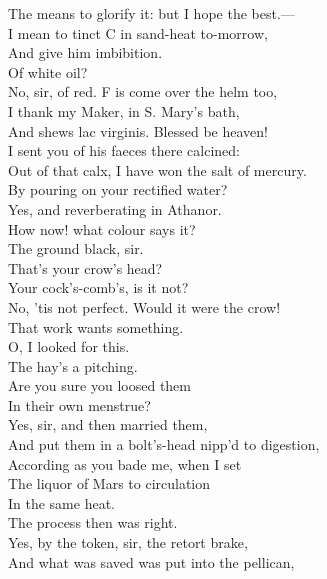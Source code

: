\documentclass[a4paper,oneside]{memoir}
\begin{document}
\begin{drama*}
The means to glorify it: but I hope the best.---\\
I mean to tinct C in sand-heat to-morrow,\\
And give him imbibition.\\
\mammonspeaks {} Of white oil?\\
\subtlespeaks No, sir, of red. F is come over the helm too,\\
I thank my Maker, in S. Mary's bath,\\
And shews lac virginis. Blessed be heaven!\\
I sent you of his faeces there calcined:\\
Out of that calx, I have won the salt of mercury.\\
\mammonspeaks By pouring on your rectified water?\\
\subtlespeaks Yes, and reverberating in Athanor.\\
How now! what colour says it?\\
\facespeaks {} The ground black, sir.\\
\mammonspeaks That's your crow's head?\\
\surlyspeaks {} Your cock's-comb's, is it not?\\
\subtlespeaks No, 'tis not perfect. Would it were the crow!\\
That work wants something.\\
\surlyspeaks {}  O, I looked for this.\\
The hay's a pitching.\\
\subtlespeaks {} Are you sure you loosed them\\
In their own menstrue?\\
\facespeaks {} Yes, sir, and then married them,\\
And put them in a bolt's-head nipp'd to digestion,\\
According as you bade me, when I set\\
The liquor of Mars to circulation\\
In the same heat.\\
\subtlespeaks {} The process then was right.\\
\facespeaks Yes, by the token, sir, the retort brake,\\
And what was saved was put into the pellican,\\

\end{drama*}
\end{document}
